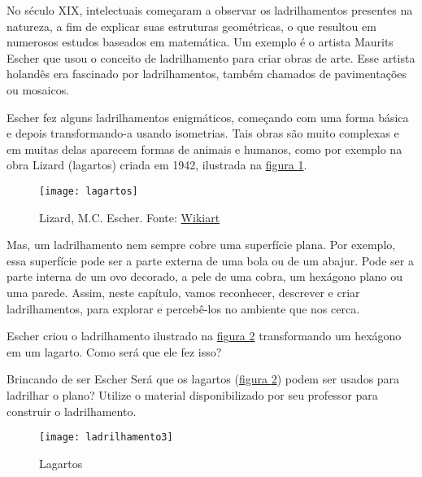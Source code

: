No século XIX, intelectuais começaram a observar os ladrilhamentos presentes na natureza, a fim de explicar suas estruturas geométricas, o que resultou em numerosos estudos baseados em matemática. Um exemplo é  o artista Maurits Escher que usou o conceito de ladrilhamento para criar obras de arte. Esse artista holandês era fascinado por ladrilhamentos, também chamados de pavimentações ou mosaicos. 

Escher fez alguns ladrilhamentos enigmáticos, começando com uma forma básica e depois transformando-a usando isometrias.  Tais obras são muito complexas e em muitas delas aparecem formas de  animais e humanos, como por exemplo na obra  Lizard (lagartos) criada em 1942, ilustrada na \hyperref[lad-fig-1]{figura \ref{lad-fig-1}}.

\begin{figure}[H]
\centering
\texttt{[image: lagartos]}

\caption{Lizard, M.C. Escher. Fonte: \href{https://www.wikiart.org/en/m-c-escher/lizard-1}{Wikiart}}
\label{lad-fig-1}
\end{figure}


Mas, um ladrilhamento nem sempre cobre uma superfície plana. Por exemplo, essa  superfície pode ser a parte externa de uma bola ou de um abajur. Pode ser  a parte interna de um ovo decorado, a pele de uma cobra, um hexágono plano ou uma parede. Assim, neste capítulo, vamos reconhecer, descrever e criar ladrilhamentos, para explorar e percebê-los no ambiente que nos cerca.

\begin{reflection}
Escher criou o ladrilhamento ilustrado na \hyperref[lizard]{figura \ref{lizard}}  transformando um hexágono em um lagarto. Como será que ele fez isso?
\end{reflection}



\begin{task}{Brincando de ser Escher} \label{at_brinc}
Será que os lagartos (\hyperref[lizard]{figura \ref{lizard}}) podem ser usados para ladrilhar o plano? 
Utilize o material disponibilizado por seu professor para construir o ladrilhamento.


\begin{figure}[H]
\centering
\texttt{[image: ladrilhamento3]}
\caption{Lagartos}
\label{lizard}
\end{figure}
\end{task}


